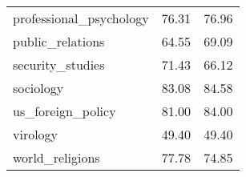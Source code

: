 \begin{table}[t]
\begin{tabular}{L{0.35}C{0.20}C{0.20}}
        professional\_psychology                & 76.31                    & 76.96                      \\
        public\_relations                       & 64.55                    & 69.09                      \\
        security\_studies                       & 71.43                    & 66.12                      \\
        sociology                               & 83.08                    & 84.58                      \\
        us\_foreign\_policy                     & 81.00                    & 84.00                      \\
        virology                                & 49.40                    & 49.40                      \\
        world\_religions                        & 77.78                    & 74.85                      \\
        \bottomrule
    \end{tabular}
\end{table}
\endgroup